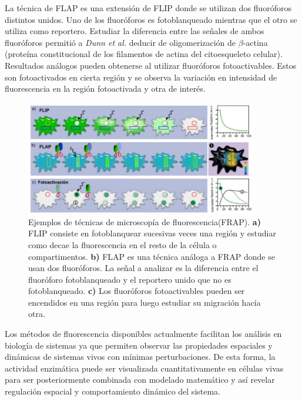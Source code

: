 La técnica de FLAP es una extensión de FLIP donde se utilizan dos fluoróforos distintos unidos. Uno de los fluoróforos es fotoblanqueado mientras que el otro se utiliza como reportero. Estudiar la diferencia entre las señales de ambos fluoróforos permitió a \textit{Dunn et al.}\cite{Dunn2002} deducir de oligomerización de $\beta$-actina (proteína constitucional de los filamentos de actina del citoesqueleto celular)\cite{Dunn2002}. Resultados análogos pueden obtenerse al utilizar fluoróforos fotoactivables. Estos son fotoactivados en cierta región y se observa la variación en intensidad de fluorescencia en la región fotoactivada y otra de interés\cite{Ishikawa-Ankerhold2012}.

\begin{figure}
    \centering
    \includegraphics[width=0.90\textwidth]{./img/FLIPetc.png}
    \caption{Ejemplos de técnicas de microscopía de fluorescencia(FRAP)\cite{Ishikawa-Ankerhold2012}. \textbf{a)} FLIP consiste en fotoblanquear sucesivas veces una región y estudiar como decae la fluorescencia en el resto de la célula o compartimentos. \textbf{b)} FLAP es una técnica análoga a FRAP donde se usan dos fluoróforos. La señal a analizar es la diferencia entre el fluoróforo fotoblanqueado y el reportero unido que no es fotoblanqueado. \textbf{c)} Los fluoróforos fotoactivables pueden ser encendidos en una región para luego estudiar su migración hacía otra.}
    \label{fig:FLIP}
\end{figure}

Los métodos de fluorescencia disponibles actualmente facilitan los análisis en biología de sistemas ya que permiten observar las propiedades espaciales y dinámicas de sistemas vivos con mínimas perturbaciones. De esta forma, la actividad enzimática puede ser visualizada cuantitativamente en células vivas para ser posteriormente combinada con modelado matemático y así revelar regulación espacial y comportamiento dinámico del sistema\cite{Verveer2008}. 


